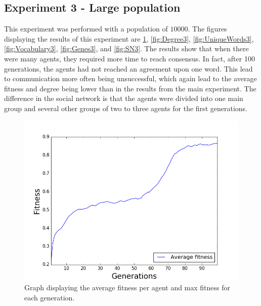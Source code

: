 \subsection{Experiment 3 - Large population}
This experiment was performed with a population of $10000$. The figures displaying the results of this experiment are \ref{fig:Fitness3}, \ref{fig:Degree3}, \ref{fig:UniqueWords3}, \ref{fig:Vocabulary3}, \ref{fig:Genes3}, and \ref{fig:SN3}. The results show that when there were many agents, they required more time to reach consensus. In fact, after 100 generations, the agents had not reached an agreement upon one word. This lead to communication more often being unsuccessful, which again lead to the average fitness and degree being lower than in the results from the main experiment. The difference in the social network is that the agents were divided into one main group and several other groups of two to three agents for the first generations.
\begin{figure}[htbp]
    \centering
    \includegraphics[scale=0.5]{fig/Results/Exp3/Fitness1}
    \caption{Graph displaying the average fitness per agent and max fitness for each generation.}
    \label{fig:Fitness3}
\end{figure}
